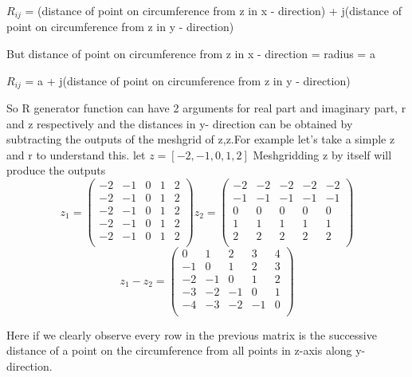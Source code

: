 \documentclass[12pt, a4paper]{report}
\begin{document}
\newline
$R_{ij}$ = (distance of point on circumference from z in x - direction) + j(distance of point on circumference from z in y - direction)

\newline
But distance of point on circumference from z in x - direction = radius = a

\newline
$R_{ij}$ = a + j(distance of point on circumference from z in y - direction)

So R generator function can have 2 arguments for real part and imaginary part, r and z respectively and the distances in y- direction can be obtained by subtracting the outputs of the meshgrid of z,z.For example let's take a simple z and r to understand this. let $z = [-2,-1,0,1,2]$ 
Meshgridding z by itself  will produce the outputs
\begin{equation*}
z_1 = 
  \begin{pmatrix}
    -2 &-1& 0 &1 &2\\
      -2 &-1& 0 &1 &2\\
        -2 &-1& 0 &1 &2\\
      -2 &-1& 0 &1 &2\\
          -2 &-1& 0 &1 &2\\
  \end{pmatrix}
 z_2= 
  \begin{pmatrix}
  -2& -2& -2 &-2& -2\\
  -1& -1& -1 &-1 &-1\\
  0& 0 &0 &0& 0\\
  1 &1& 1& 1 &1\\
  2& 2 &2 &2 &2\\
    \end{pmatrix}


\end{equation*}
\begin{equation*}
z_1-z_2=
  \begin{pmatrix}
  0& 1& 2 &3& 4\\
  -1& 0& 1 &2 &3\\
  -2& -1 &0 &1& 2\\
  -3&-2& -1& 0 &1\\
  -4& -3 &-2 &-1 &0\\
    \end{pmatrix}

 \end{equation*}
 
 Here if we clearly observe every row in the previous matrix is the successive distance of a point on the circumference from all points in z-axis along y-direction.
 
\end{document}
